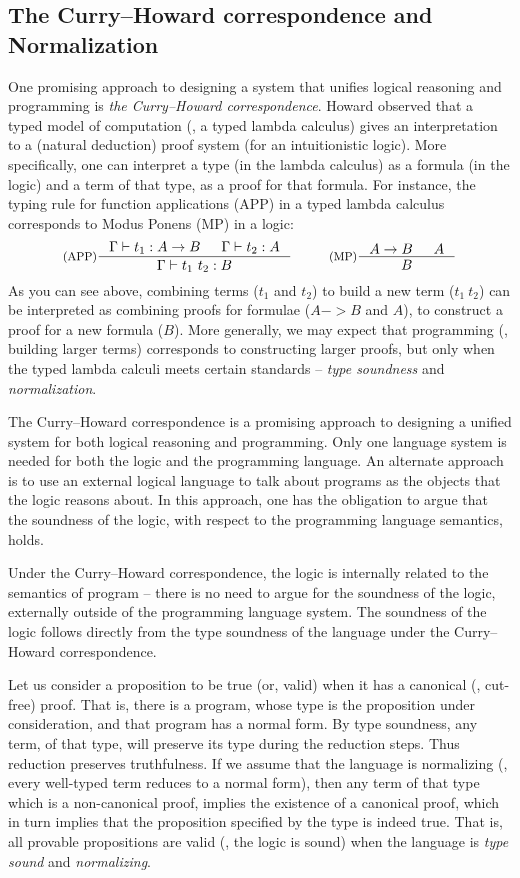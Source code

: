 \subsection{The Curry--Howard correspondence and Normalization}
\label{APP:sec:intro:concepts:CH}
One promising approach to designing a system that unifies
logical reasoning and programming is \emph{the Curry--Howard correspondence}.
Howard \cite{Howard69} observed that a typed model of computation
(\ie, a typed lambda calculus) gives an interpretation to a (natural deduction)
proof system (for an intuitionistic logic). More specifically, one can interpret
a type (in the lambda calculus) as a formula (in the logic) and
a term of that type, as a proof for that formula. For instance,
the typing rule for function applications (APP) in a typed lambda calculus
corresponds to Modus Ponens (MP) in a logic:
\[ \inference[(APP)]{\Gamma |- t_1 : A -> B & \Gamma |- t_2 : A}{
        \Gamma |- t_1~t_2 : B}
 ~~~~~~~~
   \inference[(MP)]{A -> B & A}{B}
\]
As you can see above, combining terms ($t_1$ and $t_2$) to build a new term
($t_1~t_2$) can be interpreted as combining proofs for formulae
($A -> B$ and $A$), to construct a proof for a new formula ($B$).
More generally, we may expect that programming (\ie, building larger terms)
corresponds to constructing larger proofs, but only when the typed lambda calculi
meets certain standards -- \emph{type soundness} and \emph{normalization}.

The Curry--Howard correspondence is a promising approach to designing a
unified system for both logical reasoning and programming. Only one language
system is needed for both the logic and the programming language. An
alternate approach is to use an external logical language to talk about
programs as the objects that the logic reasons about. In this approach, one
has the obligation to argue that the soundness of the logic, with respect to
the programming language semantics, holds.

Under the Curry--Howard correspondence, the logic is internally related to the
semantics of program -- there is no need to argue for the soundness of the
logic,  externally outside of the programming language system. The soundness
of the logic follows directly from the type soundness of the language under
the Curry--Howard correspondence.

Let us consider a proposition to be true
(or, valid) when it has a canonical (\ie, cut-free) proof.
That is, there is a program, whose type is the proposition under
consideration, and that program has a normal form. 
By type soundness, any term,
of that type, will preserve its type during the reduction steps. Thus
reduction preserves truthfulness. If we assume
that the language is normalizing (\ie, every well-typed term reduces to
a normal form), then any term of that type which is a non-canonical proof,
implies the existence of a canonical proof, which in turn implies that
the proposition specified by the type is indeed true. That is, all provable
propositions are valid (\ie, the logic is sound) when the language is
\emph{type sound} and \emph{normalizing}.

